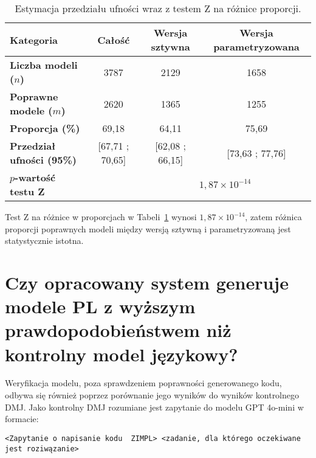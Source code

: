 \begin{table}[H]
\caption{Estymacja przedziału ufności wraz z testem Z na różnice proporcji.}\label{tab:experiment:analysis3}
\centering%
\begin{tabular}{|l|c|c|c|}
\hline
\textbf{Kategoria} & \textbf{Całość} & \textbf{Wersja sztywna} & \textbf{Wersja parametryzowana} \\
\hline
\textbf{Liczba modeli ($n$)} & 3787 & 2129 & 1658 \\
\hline
\textbf{Poprawne modele ($m$)} & 2620 & 1365 & 1255 \\
\hline
\textbf{Proporcja (\%)} & 69,18 & 64,11 & 75,69 \\
\hline
\textbf{Przedział ufności (95\%)} & [67,71 ; 70,65] & [62,08 ; 66,15] & [73,63 ; 77,76] \\
\hline
\textbf{$p$-wartość testu Z}&&\multicolumn{2}{c|}{$1,87\times 10^{-14}$}\\
\hline
\end{tabular}
\end{table}

Test Z na różnice w proporcjach w Tabeli~\ref{tab:experiment:analysis3} wynosi $1,87\times 10^{-14}$, zatem różnica proporcji poprawnych modeli między wersją sztywną i parametryzowaną jest statystycznie istotna.

\section{Czy opracowany system generuje modele PL z wyższym prawdopodobieństwem niż kontrolny model językowy?}

Weryfikacja modelu, poza sprawdzeniem poprawności generowanego kodu, odbywa się również poprzez porównanie jego wyników do wyników kontrolnego DMJ. Jako kontrolny DMJ rozumiane jest zapytanie do modelu GPT 4o-mini w formacie:

\begin{lstlisting}[language=zimpl]
<Zapytanie o napisanie kodu  ZIMPL> <zadanie, dla którego oczekiwane jest roziwązanie>
\end{lstlisting}

